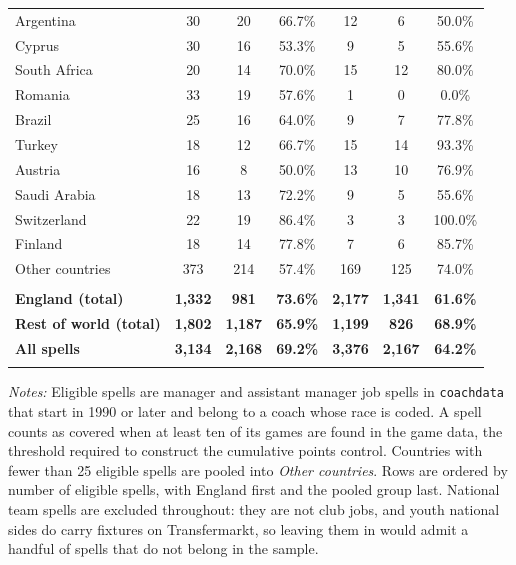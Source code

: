 \begin{table}[!htbp]
\begin{threeparttable}
\begin{tabular}{lcccccc}
Argentina & 30 & 20 & 66.7\% & 12 & 6 & 50.0\% \\ 
Cyprus & 30 & 16 & 53.3\% & 9 & 5 & 55.6\% \\ 
South Africa & 20 & 14 & 70.0\% & 15 & 12 & 80.0\% \\ 
Romania & 33 & 19 & 57.6\% & 1 & 0 & 0.0\% \\ 
Brazil & 25 & 16 & 64.0\% & 9 & 7 & 77.8\% \\ 
Turkey & 18 & 12 & 66.7\% & 15 & 14 & 93.3\% \\ 
Austria & 16 & 8 & 50.0\% & 13 & 10 & 76.9\% \\ 
Saudi Arabia & 18 & 13 & 72.2\% & 9 & 5 & 55.6\% \\ 
Switzerland & 22 & 19 & 86.4\% & 3 & 3 & 100.0\% \\ 
Finland & 18 & 14 & 77.8\% & 7 & 6 & 85.7\% \\ 
Other countries & 373 & 214 & 57.4\% & 169 & 125 & 74.0\% \\ 
\hline \\[-1.8ex]
\textbf{England (total)} & \textbf{1,332} & \textbf{981} & \textbf{73.6\%} & \textbf{2,177} & \textbf{1,341} & \textbf{61.6\%} \\ 
\textbf{Rest of world (total)} & \textbf{1,802} & \textbf{1,187} & \textbf{65.9\%} & \textbf{1,199} & \textbf{826} & \textbf{68.9\%} \\ 
\textbf{All spells} & \textbf{3,134} & \textbf{2,168} & \textbf{69.2\%} & \textbf{3,376} & \textbf{2,167} & \textbf{64.2\%} \\ 
\hline
\hline \\[-1.8ex]
\end{tabular}
\begin{tablenotes}[flushleft]
\item[] \scriptsize \textit{Notes:} Eligible spells are manager and assistant manager job spells in \texttt{coachdata} that start in 1990 or later and belong to a coach whose race is coded. A spell counts as covered when at least ten of its games are found in the game data, the threshold required to construct the cumulative points control. Countries with fewer than 25 eligible spells are pooled into \textit{Other countries}. Rows are ordered by number of eligible spells, with England first and the pooled group last. National team spells are excluded throughout: they are not club jobs, and youth national sides do carry fixtures on Transfermarkt, so leaving them in would admit a handful of spells that do not belong in the sample.
\end{tablenotes}
\end{threeparttable}
\end{table}
